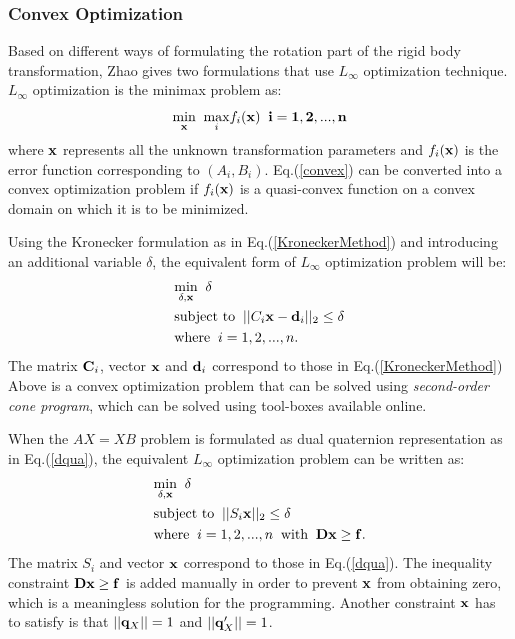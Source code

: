 \documentclass[twocolumn,10pt]{asme2ej}
\newcommand{\qq}{{\bf q}}
\newcommand{\xx}{{\bf x}}
\begin{document}
\subsubsection{Convex Optimization}
Based on different ways of formulating the rotation part of the rigid body transformation, Zhao \cite{zhao2011hand} gives two formulations that use $L_\infty$ optimization technique. $L_\infty$ optimization is the minimax problem as:
\begin{equation}
\underset{\bf x}{\text{min}} \; \; \underset{i}{\text{max}} f_{i}(\bf x) \; \; i = 1,2,... ,n
\label{convex}
\end{equation} 
where $\bf x$ represents all the unknown transformation parameters and $f_{i}(\xx)$ is the error function corresponding to $(A_i, B_i)$. Eq.(\ref{convex}) can be converted into a convex optimization problem if $f_i(\bf x)$ is a quasi-convex function on a convex domain on which it is to be minimized.  

Using the Kronecker formulation as in Eq.(\ref{KroneckerMethod}) and introducing an additional variable $\delta$, the equivalent form of $L_\infty$ optimization problem will be:
\begin{equation}
\begin{split}
&\underset{\delta, \xx}{\text{min}} \; \; \delta \\
&\text{subject to} \; \; ||C_i\xx - {\bf d}_i||_2 \leq \delta \\
&\text{where} \; \; i = 1,2,...,n.
\end{split}
\end{equation}
The matrix ${\bf C}_i$, vector $\bf x$ and ${\bf d}_i$ correspond to those in Eq.(\ref{KroneckerMethod})
Above is a convex optimization problem that can be solved using \textit{second-order cone program}, which can be solved using tool-boxes available online. 

When the $AX=XB$ problem is formulated as dual quaternion representation as in Eq.(\ref{dqua}), the equivalent $L_\infty$ optimization problem can be written as:
\begin{equation}
\begin{split}
&\underset{\delta, \xx}{\text{min}} \; \; \delta \\
&\text{subject to} \; \; ||S_i\xx||_2 \leq \delta \\
&\text{where} \; \; i = 1,2,...,n \; \; \text{with} \; \; \bf{Dx \geq f}.
\end{split}
\end{equation}
The matrix $S_i$ and vector $\bf x$ correspond to those in Eq.(\ref{dqua}). 
The inequality constraint $\bf{Dx \geq f}$ is added manually in order to prevent $\xx$ from obtaining zero, which is a meaningless solution for the programming. Another constraint $\bf x$ has to satisfy is that $||\qq_X||=1$ and $||\qq_{X}^{\prime}||=1$.
\end{document}
